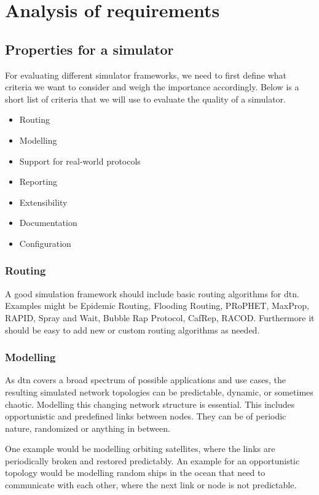 
\chapter{Analysis of requirements}

\section{Properties for a simulator}

For evaluating different simulator frameworks, we need to first define what criteria we want to consider and weigh the importance accordingly. Below is a short list of criteria that we will use to evaluate the quality of a simulator.

\begin{itemize}
  \item Routing
  \item Modelling
  \item Support for real-world protocols
  \item Reporting
  \item Extensibility
  \item Documentation
  \item Configuration
\end{itemize}

\subsection{Routing}

A good simulation framework should include basic routing algorithms for \ac{dtn}.
Examples might be Epidemic Routing, Flooding Routing, PRoPHET, MaxProp, RAPID, Spray and Wait, Bubble Rap Protocol, CafRep, RACOD. Furthermore it should be easy to add new or custom routing algorithms as needed.

\subsection{Modelling}

As \ac{dtn} covers a broad spectrum of possible applications and use cases, the resulting simulated network topologies can be predictable, dynamic, or sometimes chaotic.
Modelling this changing network structure is essential. This includes opportunistic and predefined links between nodes. They can be of periodic nature, randomized or anything in between.

One example would be modelling orbiting satellites, where the links are periodically broken and restored predictably. An example for an opportunistic topology would be modelling random ships in the ocean that need to communicate with each other, where the next link or node is not predictable.

